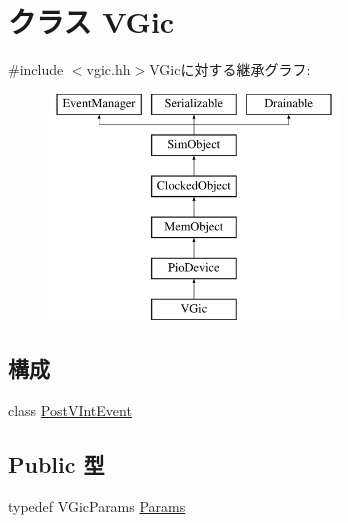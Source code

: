 \hypertarget{classVGic}{
\section{クラス VGic}
\label{classVGic}
}


{\ttfamily \#include $<$vgic.hh$>$}VGicに対する継承グラフ:\begin{figure}[H]
\begin{center}
\leavevmode
\includegraphics[height=6cm]{classVGic}
\end{center}
\end{figure}
\subsection*{構成}
\begin{DoxyCompactItemize}
\item 
class \hyperlink{classVGic_1_1PostVIntEvent}{PostVIntEvent}
\end{DoxyCompactItemize}
\subsection*{Public 型}
\begin{DoxyCompactItemize}
\item 
typedef VGicParams \hyperlink{classVGic_aba305d5be632386ad18939cafec46fee}{Params}
\end{DoxyCompactItemize}
